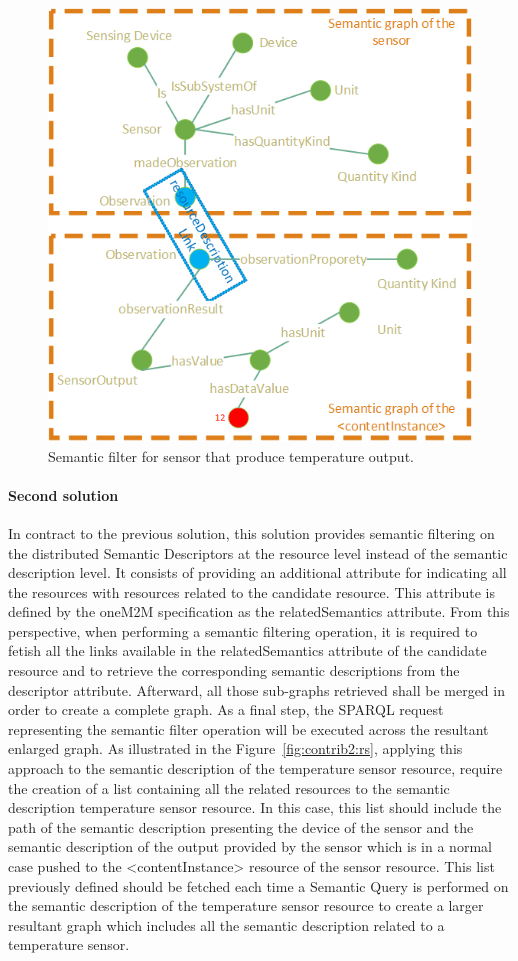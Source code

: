 \begin{figure}[htbp]
    \centering
    \includegraphics[width=.7\textwidth]{resources/images/link}
    \caption{Semantic filter for sensor that produce temperature output. }\label{fig:contrib2:link}
\end{figure}

\paragraph{Second solution}
In contract to the previous solution, this solution provides semantic filtering on the distributed Semantic Descriptors at the resource level instead of the semantic description level. It consists of providing an additional attribute for indicating all the resources with resources related to the candidate resource. This attribute is defined by the oneM2M specification as the relatedSemantics attribute. From this perspective, when performing a semantic filtering operation, it is required to fetish all the links available in the relatedSemantics attribute of the candidate resource and to retrieve the corresponding semantic descriptions from the descriptor attribute. Afterward, all those sub-graphs retrieved shall be merged in order to create a complete graph. As a final step, the SPARQL request representing the semantic filter operation will be executed across the resultant enlarged graph. As illustrated in the Figure~\ref{fig:contrib2:rs}, applying this approach to the semantic description of the temperature sensor resource, require the creation of a list containing all the related resources to the semantic description temperature sensor resource. In this case, this list should include the path of the semantic description presenting the device of the sensor and the semantic description of the output provided by the sensor which is in a normal case pushed to the <contentInstance> resource of the sensor resource. This list previously defined should be fetched each time a Semantic Query is performed on the semantic description of the temperature sensor resource to create a larger resultant graph which includes all the semantic description related to a temperature sensor.

